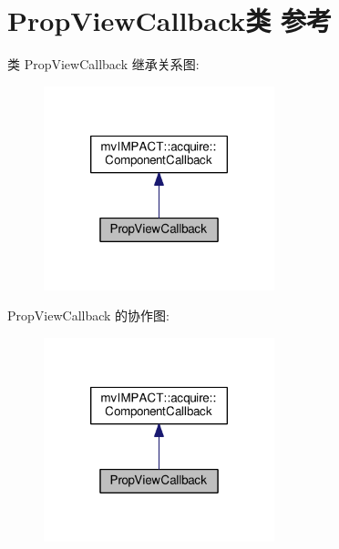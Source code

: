 \hypertarget{class_prop_view_callback}{\section{Prop\+View\+Callback类 参考}
\label{class_prop_view_callback}
}


类 Prop\+View\+Callback 继承关系图\+:
\nopagebreak
\begin{figure}[H]
\begin{center}
\leavevmode
\includegraphics[width=190pt]{class_prop_view_callback__inherit__graph}
\end{center}
\end{figure}


Prop\+View\+Callback 的协作图\+:
\nopagebreak
\begin{figure}[H]
\begin{center}
\leavevmode
\includegraphics[width=190pt]{class_prop_view_callback__coll__graph}
\end{center}
\end{figure}
